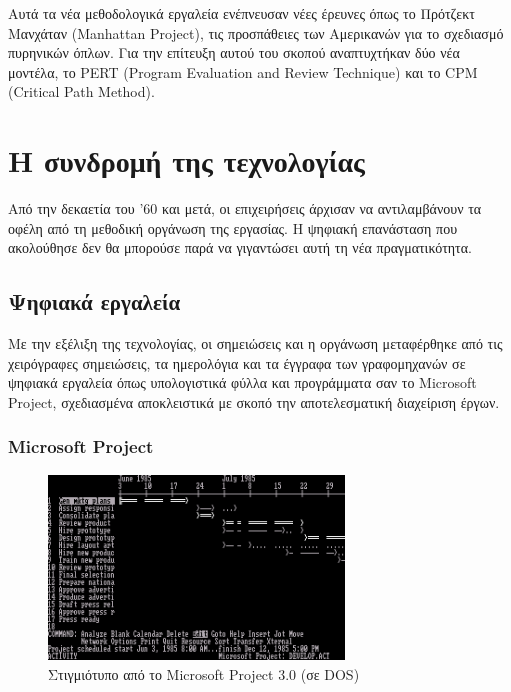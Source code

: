             Αυτά τα νέα μεθοδολογικά εργαλεία ενέπνευσαν νέες έρευνες όπως το Πρότζεκτ Μανχάταν (Manhattan Project), τις προσπάθειες των Αμερικανών για το σχεδιασμό πυρηνικών όπλων. Για την επίτευξη αυτού του σκοπού αναπτυχτήκαν δύο νέα μοντέλα, το PERT (Program Evaluation and Review Technique) και το CPM (Critical Path Method). \cite{SaylorAcademyProjectManagement}
            
    \section{Η συνδρομή της τεχνολογίας}
        Από την δεκαετία του '60 και μετά, οι επιχειρήσεις άρχισαν να αντιλαμβάνουν τα οφέλη από τη μεθοδική οργάνωση της εργασίας. Η ψηφιακή επανάσταση που ακολούθησε δεν θα μπορούσε παρά να γιγαντώσει αυτή τη νέα πραγματικότητα.
    
        \subsection{Ψηφιακά εργαλεία}
            Με την εξέλιξη της τεχνολογίας, οι σημειώσεις και η οργάνωση μεταφέρθηκε από τις χειρόγραφες σημειώσεις, τα ημερολόγια και τα έγγραφα των γραφομηχανών σε ψηφιακά εργαλεία όπως υπολογιστικά φύλλα και προγράμματα σαν το Microsoft Project, σχεδιασμένα αποκλειστικά με σκοπό την αποτελεσματική διαχείριση έργων. 

            \subsubsection{Microsoft Project}
                \begin{figure}[H] \noindent \centering
                    \includegraphics[width=0.7\textwidth]{img/MicrosoftProject3.png}
                    \caption{\centering Στιγμιότυπο από το Microsoft Project 3.0 (σε DOS) \cite{WinWorld}}
                \end{figure}
                
